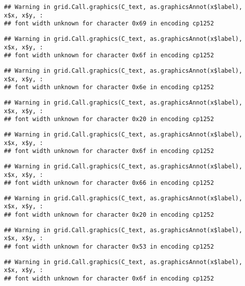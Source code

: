 \documentclass[
]{article}
\begin{document}
\begin{verbatim}
## Warning in grid.Call.graphics(C_text, as.graphicsAnnot(x$label), x$x, x$y, :
## font width unknown for character 0x69 in encoding cp1252
\end{verbatim}

\begin{verbatim}
## Warning in grid.Call.graphics(C_text, as.graphicsAnnot(x$label), x$x, x$y, :
## font width unknown for character 0x6f in encoding cp1252
\end{verbatim}

\begin{verbatim}
## Warning in grid.Call.graphics(C_text, as.graphicsAnnot(x$label), x$x, x$y, :
## font width unknown for character 0x6e in encoding cp1252
\end{verbatim}

\begin{verbatim}
## Warning in grid.Call.graphics(C_text, as.graphicsAnnot(x$label), x$x, x$y, :
## font width unknown for character 0x20 in encoding cp1252
\end{verbatim}

\begin{verbatim}
## Warning in grid.Call.graphics(C_text, as.graphicsAnnot(x$label), x$x, x$y, :
## font width unknown for character 0x6f in encoding cp1252
\end{verbatim}

\begin{verbatim}
## Warning in grid.Call.graphics(C_text, as.graphicsAnnot(x$label), x$x, x$y, :
## font width unknown for character 0x66 in encoding cp1252
\end{verbatim}

\begin{verbatim}
## Warning in grid.Call.graphics(C_text, as.graphicsAnnot(x$label), x$x, x$y, :
## font width unknown for character 0x20 in encoding cp1252
\end{verbatim}

\begin{verbatim}
## Warning in grid.Call.graphics(C_text, as.graphicsAnnot(x$label), x$x, x$y, :
## font width unknown for character 0x53 in encoding cp1252
\end{verbatim}

\begin{verbatim}
## Warning in grid.Call.graphics(C_text, as.graphicsAnnot(x$label), x$x, x$y, :
## font width unknown for character 0x6f in encoding cp1252
\end{verbatim}
\end{document}
